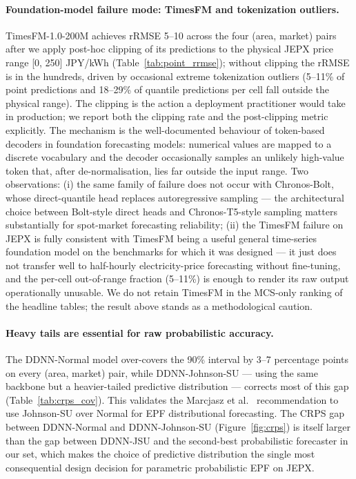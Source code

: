 \documentclass[review,3p,times,authoryear]{elsarticle}
\begin{document}
\paragraph{Foundation-model failure mode: TimesFM and tokenization outliers.}
TimesFM-1.0-200M \citep{das2024timesfm} achieves rRMSE 5--10 across the four (area, market) pairs after we apply post-hoc clipping of its predictions to the physical JEPX price range [0, 250] JPY/kWh (Table~\ref{tab:point_rrmse}); without clipping the rRMSE is in the hundreds, driven by occasional extreme tokenization outliers (5--11\% of point predictions and 18--29\% of quantile predictions per cell fall outside the physical range). The clipping is the action a deployment practitioner would take in production; we report both the clipping rate and the post-clipping metric explicitly. The mechanism is the well-documented behaviour of token-based decoders in foundation forecasting models: numerical values are mapped to a discrete vocabulary and the decoder occasionally samples an unlikely high-value token that, after de-normalisation, lies far outside the input range. Two observations: (i) the same family of failure does not occur with Chronos-Bolt, whose direct-quantile head replaces autoregressive sampling --- the architectural choice between Bolt-style direct heads and Chronos-T5-style sampling matters substantially for spot-market forecasting reliability; (ii) the TimesFM failure on JEPX is fully consistent with TimesFM being a useful general time-series foundation model on the benchmarks for which it was designed --- it just does not transfer well to half-hourly electricity-price forecasting without fine-tuning, and the per-cell out-of-range fraction (5--11\%) is enough to render its raw output operationally unusable. We do not retain TimesFM in the MCS-only ranking of the headline tables; the result above stands as a methodological caution.

\paragraph{Heavy tails are essential for raw probabilistic accuracy.}
The DDNN-Normal model over-covers the 90\% interval by 3--7 percentage points on every (area, market) pair, while DDNN-Johnson-SU --- using the same backbone but a heavier-tailed predictive distribution --- corrects most of this gap (Table~\ref{tab:crps_cov}). This validates the Marcjasz et al.\ \citep{marcjasz2023} recommendation to use Johnson-SU over Normal for EPF distributional forecasting. The CRPS gap between DDNN-Normal and DDNN-Johnson-SU (Figure~\ref{fig:crps}) is itself larger than the gap between DDNN-JSU and the second-best probabilistic forecaster in our set, which makes the choice of predictive distribution the single most consequential design decision for parametric probabilistic EPF on JEPX.
\end{document}
